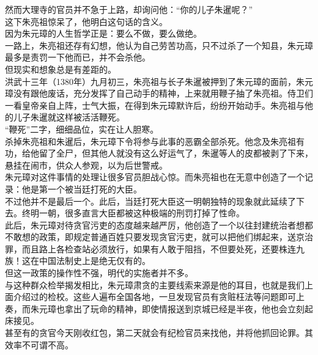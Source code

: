 \begin{multicols}{\theparacolNo}
然而大理寺的官员并不急于上路，却询问他：“你的儿子朱暹呢？”\\

这下朱亮祖惊呆了，他明白这句话的含义。\\

因为朱元璋的人生哲学正是：要么不做，要么做绝。\\

一路上，朱亮祖还存有幻想，他认为自己劳苦功高，只不过杀了一个知县，朱元璋最多是责罚一下他而已，并不会杀他。\\

但现实和想象总是有差距的。\\

洪武十三年（1380年）九月初三，朱亮祖与长子朱暹被押到了朱元璋的面前，朱元璋没有跟他废话，充分发挥了自己动手的精神，上来就用鞭子抽了朱亮祖。侍卫们一看皇帝亲自上阵，士气大振，在得到朱元璋默许后，纷纷开始动手。朱亮祖与他的儿子朱暹就这样被活活鞭死。\\

“鞭死”二字，细细品位，实在让人胆寒。\\

杀掉朱亮祖和朱暹后，朱元璋下令将参与此事的恶霸全部杀死。他念及朱亮祖有功，给他留了全尸，但其他人就没有这么好运气了，朱暹等人的皮都被剥了下来，悬挂在闹市，供众人参观，以为后世警戒。\\

朱元璋对这件事情的处理让很多官员胆战心惊。而朱亮祖也在无意中创造了一个记录：他是第一个被当廷打死的大臣。\\

不过他并不是最后一个。此后，当廷打死大臣这一明朝独特的现象就此延续了下去。终明一朝，很多直言大臣都被这种极端的刑罚打掉了性命。\\

此后，朱元璋对待贪官污吏的态度越来越严厉，他创造了一个以往封建统治者想都不敢想的政策，即规定普通百姓只要发现贪官污吏，就可以把他们绑起来，送京治罪，而且路上各检查站必须放行，如果有人敢于阻挡，不但要处死，还要株连九族！这在中国法制史上是绝无仅有的。\\

但这一政策的操作性不强，明代的实施者并不多。\\

与这种群众检举揭发相比，朱元璋肃贪的主要线索来源是他的耳目，也就是我们上面介绍过的检校。这些人遍布全国各地，一旦发现官员有贪赃枉法等问题即可上奏，而朱元璋也拿出了玩命的精神，即使情报送到京城已经是半夜，他也会立刻起床接见。\\

甚至有的贪官今天刚收红包，第二天就会有纪检官员来找他，并将他抓回论罪。其效率不可谓不高。\\


\end{multicols}
